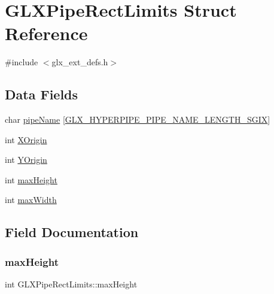 \hypertarget{struct_g_l_x_pipe_rect_limits}{}\section{G\+L\+X\+Pipe\+Rect\+Limits Struct Reference}
\label{struct_g_l_x_pipe_rect_limits}


{\ttfamily \#include $<$glx\+\_\+ext\+\_\+defs.\+h$>$}

\subsection*{Data Fields}
\begin{DoxyCompactItemize}
\item 
char \hyperlink{struct_g_l_x_pipe_rect_limits_ae78b4b6656101bc841946733a5b6e5ce}{pipe\+Name} \mbox{[}\hyperlink{glx__ext__defs_8h_ae1c8261c0861010d8003a31d07e26005}{G\+L\+X\+\_\+\+H\+Y\+P\+E\+R\+P\+I\+P\+E\+\_\+\+P\+I\+P\+E\+\_\+\+N\+A\+M\+E\+\_\+\+L\+E\+N\+G\+T\+H\+\_\+\+S\+G\+IX}\mbox{]}
\item 
int \hyperlink{struct_g_l_x_pipe_rect_limits_a3e5a965059d9f5d2ca42acd35af5bb9b}{X\+Origin}
\item 
int \hyperlink{struct_g_l_x_pipe_rect_limits_a50e06bcf0dae95854be7d93a515199e9}{Y\+Origin}
\item 
int \hyperlink{struct_g_l_x_pipe_rect_limits_a27572e499c0d3280031c2ad8e387c0c1}{max\+Height}
\item 
int \hyperlink{struct_g_l_x_pipe_rect_limits_a8662c7a712b30620e25fc994adf337a1}{max\+Width}
\end{DoxyCompactItemize}


\subsection{Field Documentation}
\mbox{\label{struct_g_l_x_pipe_rect_limits_a27572e499c0d3280031c2ad8e387c0c1}} 
\subsubsection{\texorpdfstring{max\+Height}{maxHeight}}
{\footnotesize\ttfamily int G\+L\+X\+Pipe\+Rect\+Limits\+::max\+Height}

